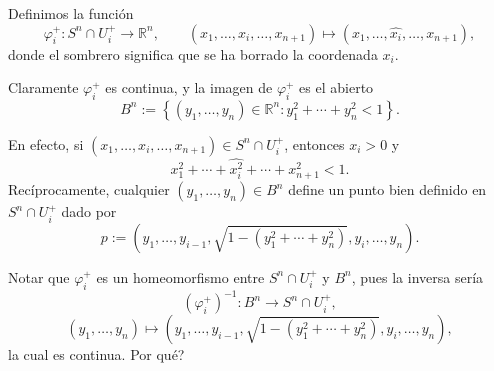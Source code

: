 \documentclass[11pt]{article}
\theoremstyle{definition}
\theoremstyle{remark}
\begin{document}
\medskip

Definimos la funci\'on
\[
\varphi_i^+:S^n\cap U_i^+\longrightarrow \mathbb{R}^n,
\qquad
(x_1,\dots,x_i,\dots,x_{n+1})\longmapsto (x_1,\dots,\widehat{x_i},\dots,x_{n+1}),
\]
donde el sombrero significa que se ha borrado la coordenada $x_i$.

Claramente $\varphi_i^+$ es continua, y la imagen de $\varphi_i^+$ es el abierto
\[
B^n:=\left\{(y_1,\dots,y_n)\in \mathbb{R}^n:y_1^2+\cdots+y_n^2<1\right\}.
\]

En efecto, si $(x_1,\dots,x_i,\dots,x_{n+1})\in S^n\cap U_i^+$, entonces $x_i>0$ y
\[
x_1^2+\cdots+\widehat{x_i^2}+\cdots+x_{n+1}^2<1.
\]
Rec\'iprocamente, cualquier $(y_1,\dots,y_n)\in B^n$ define un punto bien definido en $S^n\cap U_i^+$ dado por
\[
p:=\left(y_1,\dots,y_{i-1},\sqrt{1-(y_1^2+\cdots+y_n^2)},y_i,\dots,y_n\right).
\]

Notar que $\varphi_i^+$ es un homeomorfismo entre $S^n\cap U_i^+$ y $B^n$, pues la inversa ser\'ia
\[
(\varphi_i^+)^{-1}:B^n\longrightarrow S^n\cap U_i^+,
\]
\[
(y_1,\dots,y_n)\longmapsto
\left(y_1,\dots,y_{i-1},\sqrt{1-(y_1^2+\cdots+y_n^2)},y_i,\dots,y_n\right),
\]
la cual es continua. \textquestiondown Por qu\'e?
\end{document}
